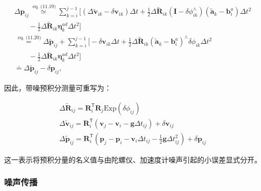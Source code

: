 \begin{equation}
\begin{array}{l} \Delta \boldsymbol {p} _ {i j} \stackrel {{\text { eq. (11.19)}}} {{\simeq}} \sum_ {k = i} ^ {j - 1} \Big [ (\Delta \tilde {\boldsymbol {v}} _ {i k} - \delta \boldsymbol {v} _ {i k}) \Delta t + \frac {1}{2} \Delta \tilde {\boldsymbol {R}} _ {i k} (\mathbf {I} - \delta \phi_ {i k} ^ {\wedge})   (\tilde {\mathbf {a}} _ {k} - \mathbf {b} _ {i} ^ {a})   \Delta t ^ {2} \\ \qquad - \frac {1}{2} \Delta \tilde {\boldsymbol {R}} _ {i k} \boldsymbol {\eta} _ {k} ^ {a d}   \Delta t ^ {2} \Big ] \\ \stackrel {{\text { eq. (11.20)}}} {{=}} \Delta \tilde {\boldsymbol {p}} _ {i j} + \sum_ {k = i} ^ {j - 1} \Big [ - \delta \boldsymbol {v} _ {i k} \Delta t + \frac {1}{2} \Delta \tilde {\boldsymbol {R}} _ {i k}   (\tilde {\mathbf {a}} _ {k} - \mathbf {b} _ {i} ^ {a}) ^ {\wedge}   \delta \phi_ {i k} \Delta t ^ {2} \\ \qquad - \frac {1}{2} \Delta \tilde {\boldsymbol {R}} _ {i k} \boldsymbol {\eta} _ {k} ^ {a d}   \Delta t ^ {2} \Big ] \\ \doteq \Delta \tilde {\boldsymbol {p}} _ {i j} - \delta \boldsymbol {p} _ {i j}, \end{array}\tag{11.22}
\end{equation}

因此，带噪预积分测量可重写为：

\begin{equation}
\begin{array}{l} \Delta \tilde {\boldsymbol {R}} _ {i j} = \boldsymbol {R} _ {i} ^ {\mathsf {T}} \boldsymbol {R} _ {j} \mathrm{Exp} (\delta \phi_ {i j}) \\ \Delta \tilde {\boldsymbol {v}} _ {i j} = \boldsymbol {R} _ {i} ^ {\mathsf {T}} (\boldsymbol {v} _ {j} - \boldsymbol {v} _ {i} - \mathbf {g} \Delta t _ {i j}) + \delta \boldsymbol {v} _ {i j} \\ \Delta \tilde {\boldsymbol {p}} _ {i j} = \boldsymbol {R} _ {i} ^ {\mathsf {T}} (\boldsymbol {p} _ {j} - \boldsymbol {p} _ {i} - \boldsymbol {v} _ {i} \Delta t _ {i j} - \frac {1}{2} \mathbf {g} \Delta t _ {i j} ^ {2}) + \delta \boldsymbol {p} _ {i j} \end{array}\tag{11.23}
\end{equation}

这一表示将预积分量的名义值与由陀螺仪、加速度计噪声引起的小误差显式分开。

\subsubsection{噪声传播}

